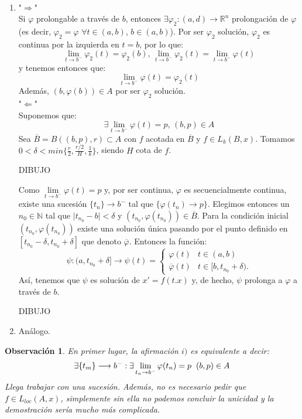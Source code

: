 \documentclass{article}
\makeatletter
\providecommand{\abs}[1]{\lvert#1\rvert}
\theoremstyle{theorem-style}  %
\theoremstyle{definition-style}
\newtheorem*{observation}{Observación} %
\theoremstyle{example-style}
\renewenvironment{proof}[1][\proofname]{\par
	\pushQED{\qed}%
	\normalfont \topsep6\p@\@plus6\p@\relax
	\list{}{%
		\settowidth{\leftmargin}{\quad:\hskip\labelsep}%
		\setlength{\labelwidth}{0pt}%
		\setlength{\itemindent}{-\leftmargin}%
	}%
	\item[\hskip\labelsep\itshape#1\@addpunct{:}]\ignorespaces
}{%
	\popQED\endlist\@endpefalse
}
\makeatother
\begin{document}
\begin{proof}\ 
	\begin{enumerate} [\quad i)]
		\item "$\Rightarrow$" \\
		Si $\varphi$ prolongable a través de $b$, entonces $\exists \varphi_2 : (a, d) \longrightarrow \mathbb{R}^n$ prolongación de $\varphi$ (es decir, $\varphi_2 = \varphi$ $\forall t \in (a, b)$, $b \in (a, b)$). Por ser $\varphi_2$ solución, $\varphi_2$ es continua por la izquierda en $t = b$, por lo que:
		\[\lim\limits_{t \to b^-} \varphi_2(t) = \varphi_2(b) \text{, } \lim\limits_{t \to b^-} \varphi_2(t) = \lim\limits_{t \to b^-} \varphi(t)\]
		y tenemos entonces que:
		\[\lim\limits_{t \to b^-} \varphi(t) = \varphi_2(t)\]
		Además, $(b, \varphi(b)) \in A$ por ser $\varphi_2$ solución. \\
		"$\Leftarrow$" \\
		Suponemos que:
		\[\exists \lim\limits_{t \to b^-} \varphi(t) = p \text{, } (b, p) \in A\]
		Sea $\overline{B} = B((b, p), r) \subset A$ con $f$ acotada en $\overline{B}$ y $f \in L_k (B, x)$. Tomamos $0 < \delta < min\{\frac{r}{2}, \frac{r/2}{H}, \frac{1}{k}\}$, siendo $H$ cota de $f$.
		
		DIBUJO
		
		Como $\lim\limits_{t \to b^-} \varphi (t) = p$ y, por ser continua, $ \varphi $ es secuencialmente continua, existe una sucesión $\{t_n\} \longrightarrow b^-$ tal que $\{\varphi(t_n) \longrightarrow p\}$. Elegimos entonces un $n_0 \in \mathbb{N}$ tal que $\abs{t_{n_0} - b} < \delta$ y $(t_{n_0}, \varphi (t_{n_0})) \in \overline{B}$. Para la condición inicial $(t_{n_0}, \varphi (t_{n_0}))$ existe una solución única pasando por el punto definido en $[t_{n_0} - \delta, t_{n_0} + \delta]$ que denoto $\overline{\varphi}$. Entonces la función:
		\[\psi: (a, t_{n_0} + \delta] \longrightarrow \psi (t) = \begin{cases}
		\varphi(t) &t \in (a, b) \\ 
		\overline{\varphi} (t) &t \in [b, t_{n_0} + \delta).
		\end{cases}\]
		Así, tenemos que $\psi$ es solución de $x' = f(t. x)$ y, de hecho, $\psi$ prolonga a $\varphi$ a través de $b$.
		
		DIBUJO
		\item Análogo.
	\end{enumerate} 
\end{proof}
\begin{observation}
	En primer lugar, la afirmación $i)$ es equivalente a decir:
	\[\exists \{t_m\} \longrightarrow b^- : \exists \lim\limits_{t_n \to b^-} \varphi(t_n) = p \hspace{0.2cm} (b, p) \in A\]
	Llega trabajar con una sucesión. Además, no es necesario pedir que $f \in L_{loc}(A, x)$, simplemente sin ella no podemos concluir la unicidad y la demostración sería mucho más complicada.
\end{observation}
\end{document}

